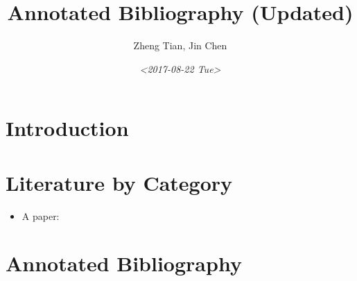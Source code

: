 \documentclass[a4paper,11pt]{article}
\author{Zheng Tian, Jin Chen}
\date{\textit{<2017-08-22 Tue>}}
\title{Annotated Bibliography (Updated)}
\begin{document}
\maketitle


\section{Introduction \label{introduction}}
\label{sec:org26b27ab}

\section{Literature by Category \label{lit_category}}
\label{sec:orgfcf6489}

\begin{itemize}
\item A paper: \cite{Simmie2003}
\end{itemize}

\section{Annotated Bibliography \label{annotated_bib}}
\label{sec:org8457eae}




\end{document}

